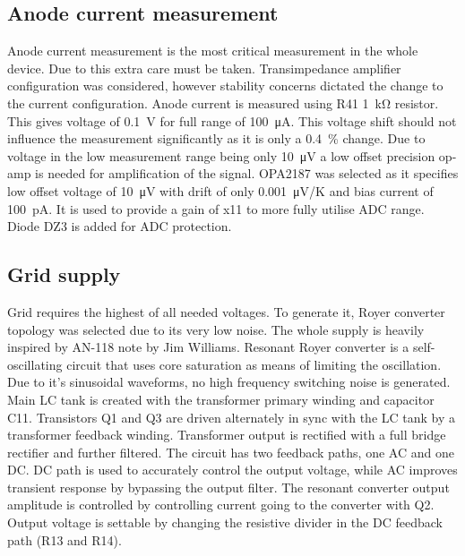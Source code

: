 \documentclass{article}
\begin{document}
\subsection{Anode current measurement}
Anode current measurement is the most critical measurement in the whole device. Due to this extra care must be taken. Transimpedance amplifier configuration was considered, however stability concerns dictated the change to the current configuration.
Anode current is measured using R41 \SI{1}{\kilo\ohm} resistor. This gives voltage of \SI{0.1}{\volt} for full range of \SI{100}{\micro\ampere}. This voltage shift should not influence the measurement significantly as it is only a \SI{0.4}{\%} change.
Due to voltage in the low measurement range being only \SI{10}{\micro\volt} a low offset precision op-amp is needed for amplification of the signal.
OPA2187 was selected as it specifies low offset voltage of \SI{10}{\micro\volt} with drift of only \SI{0.001}{\micro\volt/\kelvin} and bias current of \SI{100}{\pico\ampere}.
It is used to provide a gain of x11 to more fully utilise ADC range. Diode DZ3 is added for ADC protection.




\subsection{Grid supply}
Grid requires the highest of all needed voltages. To generate it, Royer converter topology was selected due to its very low noise. The whole supply is heavily inspired by AN-118 note by Jim Williams.
Resonant Royer converter is a self-oscillating circuit that uses core saturation as means of limiting the oscillation. Due to it's sinusoidal waveforms, no high frequency switching noise is generated.
Main LC tank is created with the transformer primary winding and capacitor C11. Transistors Q1 and Q3 are driven alternately in sync with the LC tank by a transformer feedback winding.
Transformer output is rectified with a full bridge rectifier and further filtered. The circuit has two feedback paths, one AC and one DC. DC path is used to accurately control the output voltage, while AC improves transient response by bypassing the output filter.
The resonant converter output amplitude is controlled by controlling current going to the converter with Q2. Output voltage is settable by changing the resistive divider in the DC feedback path (R13 and R14).
\end{document}
